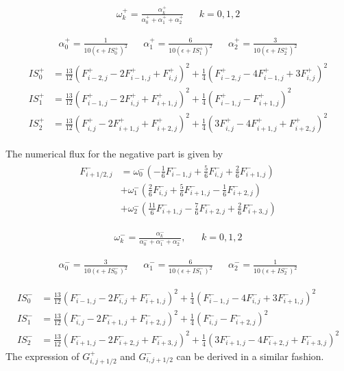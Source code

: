 \documentclass{rsproca}%
\begin{document}
\begin{align}
&\omega_{k}^{+} = \frac{\alpha_{k}^{+}}{\alpha_{0}^{+}+\alpha_{1}^{+}+\alpha_{2}^{+}}& &k = 0,1,2&
\end{align}

\begin{align}
&\alpha_{0}^{+}=\frac{1}{10(\epsilon+IS_{0}^{+})^2}& 
&\alpha_{1}^{+}=\frac{6}{10(\epsilon+IS_{1}^{+})^2}&
&\alpha_{2}^{+}=\frac{3}{10(\epsilon+IS_{2}^{+})^2}&
\end{align}
\begin{align}
	\begin{split}
IS_{0}^+ &= \frac{13}{12}\left(F_{i-2,j}^+ -2F_{i-1,j}^+ +F_{i,j}^+\right)^2 +\frac{1}{4}\left(F_{i-2,j}^+ -4F_{i-1,j}^+ +3F_{i,j}^+\right)^2\\
IS_{1}^+ &= \frac{13}{12}\left(F_{i-1,j}^+ -2F_{i,j}^+ +F_{i+1,j}^+\right)^2 +\frac{1}{4}\left(F_{i-1,j}^+ -F_{i+1,j}^+\right)^2\\
IS_{2}^+ &= \frac{13}{12}\left(F_{i,j}^+ 	 -2F_{i+1,j}^+ +F_{i+2,j}^+\right)^2 +\frac{1}{4}\left(3F_{i,j}^+ -4F_{i+1,j}^+ +F_{i+2,j}^+\right)^2
	\end{split}
\end{align}

The numerical flux for the negative part is given by
\begin{align}
	\begin{split}
F_{i+1/2,j}^-
&= \omega_{0}^{-}\left(-\frac{1}{6}F_{i-1,j}^-  +\frac{5}{6}F_{i,j}^-   +\frac{2}{6}F_{i+1,j}^-\right) \\
&+ \omega_{1}^{-}\left( \frac{2}{6}F_{i,j}^-    +\frac{5}{6}F_{i+1,j}^- -\frac{1}{6}F_{i+2,j}^-\right) \\
&+ \omega_{2}^{-}\left( \frac{11}{6}F_{i+1,j}^- -\frac{7}{6}F_{i+2,j}^- +\frac{2}{6}F_{i+3,j}^-\right)
	\end{split}
\end{align}

\begin{align}
&\omega_{k}^{-} = \frac{\alpha_{k}^{-}}{\alpha_{0}^{-}+\alpha_{1}^{-}+\alpha_{2}^{-}},&  &k = 0,1,2&
\end{align}

\begin{align}
&\alpha_{0}^{-}=\frac{3}{10(\epsilon+IS_{0}^{-})^2}& 
&\alpha_{1}^{-}=\frac{6}{10(\epsilon+IS_{1}^{-})^2}& 
&\alpha_{2}^{-}=\frac{1}{10(\epsilon+IS_{2}^{-})^2}&
\end{align}

\begin{align}
IS_{0}^- &= \frac{13}{12}\left(F_{i-1,j}^- -2F_{i,j}^- +F_{i+1,j}^-\right)^2 +\frac{1}{4}\left(F_{i-1,j}^- -4F_{i,j}^- +3F_{i+1,j}^-\right)^2\\
IS_{1}^- &= \frac{13}{12}\left(F_{i,j}^- -2F_{i+1,j}^- +F_{i+2,j}^-\right)^2 +\frac{1}{4}\left(F_{i,j}^- -F_{i+2,j}^-\right)^2\\
IS_{2}^- &= \frac{13}{12}\left(F_{i+1,j}^- -2F_{i+2,j}^- +F_{i+3,j}^-\right)^2+\frac{1}{4}\left(3F_{i+1,j}^- -4F_{i+2,j}^- +F_{i+3,j}^-\right)^2
\end{align}
The expression of $G_{i,j+1/2}^+$ and $G_{i,j+1/2}^-$ can be derived in a similar fashion.
\end{document}
